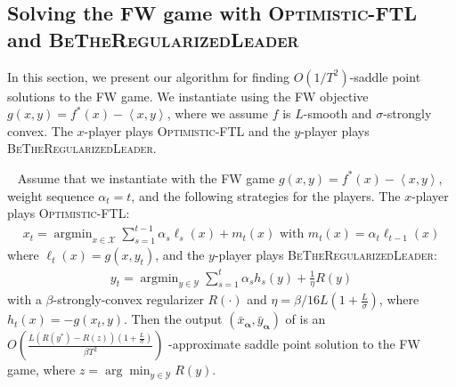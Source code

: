 \documentclass[pmlr]{jmlr} %
\def\argmin{\mathop{\arg\min}}
\def\balpha{\boldsymbol{\alpha}}
\def\BTRL{\textsc{BeTheRegularizedLeader}\xspace}
\def\OFTL{\textsc{Optimistic-FTL}\xspace}
\newcommand{\lr}[2]{\left\langle#1,#2\right\rangle}
\newcommand{\XX}{\mathcal{X}}
\newcommand{\YY}{\mathcal{Y}}
\newcommand{\pr}[1]{\left(#1\right)}
\begin{document}
\subsection{Solving the FW game with \OFTL and \BTRL}
In this section, we present our algorithm for finding $O(1/T^{2})$-saddle point solutions to the FW game. We instantiate  using the FW objective $g(x,y) = f^{*}(x) - \lr{x}{y}$, where we assume $f$ is $L$-smooth and $\sigma$-strongly convex. The $x$-player plays \OFTL and the $y$-player plays \BTRL.
\begin{theorem}~\label{thm:FWgame}
Assume that we instantiate  with the FW game $g(x,y) = f^{*}(x) - \lr{x}{y}$, weight sequence $\alpha_{t}=t$, and the following strategies for the players. The $x$-player plays \OFTL: 
\begin{align}\label{eq:XplayerFWgame}
  \textstyle x_{t} = \argmin_{x \in \XX} \sum_{s=1}^{t-1} \alpha_{s} \ell_{s}(x) + m_{t}(x) \text{ with } m_{t}(x) = \alpha_{t} \ell_{{t-1}}(x)
\end{align}
where $\ell_{t}(x) = g(x,y_{t})$, and the $y$-player plays \BTRL: 
\begin{align}\label{eq:YplayerFWgame}
\textstyle y_{t} = \argmin_{y \in \YY} \sum_{s=1}^{t} \alpha_{s} h_{s}(y) + \frac{1}{\eta} R(y)
\end{align}
with a $\beta$-strongly-convex regularizer $R(\cdot)$ and $\eta = {\beta }/{ 16L ( 1 + \frac{L}{\sigma})}$, where $h_{t}(x) = -g(x_{t},y)$. Then the output $(\bar{x}_{\balpha},\bar{y}_{\balpha})$ of    is 
an $O\pr{ \frac{ L ( R(y^{*}) - R(z) )(1+\frac{L}{\sigma}) }{ \beta T^{2}}}$
-approximate saddle point solution to the FW game,
where $z = \arg\min_{{y\in \YY}} R(y) $.
\end{theorem}
\end{document}
